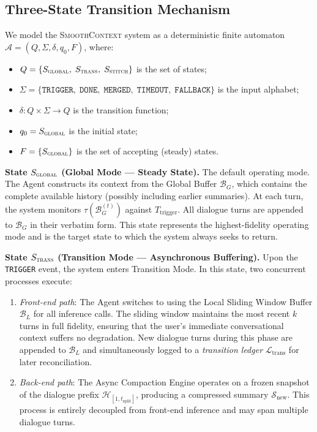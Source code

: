 \documentclass[10pt,twocolumn]{article}
\newcommand{\sys}{\textsc{SmoothContext}}
\newcommand{\bufG}{\mathcal{B}_G}
\newcommand{\bufL}{\mathcal{B}_L}
\newcommand{\Dtok}{\tau}
\newcommand{\Ttrig}{T_{\mathrm{trigger}}}
\begin{document}
\subsection{Three-State Transition Mechanism}\label{sec:state}

We model the \sys{} system as a deterministic finite automaton $\mathcal{A} = (Q, \Sigma, \delta, q_0, F)$, where:
\begin{itemize}
  \item $Q = \{S_{\textsc{global}},\; S_{\textsc{trans}},\; S_{\textsc{stitch}}\}$ is the set of states;
  \item $\Sigma = \{\texttt{TRIGGER},\; \texttt{DONE},\; \texttt{MERGED},\; \texttt{TIMEOUT},\; \texttt{FALLBACK}\}$ is the input alphabet;
  \item $\delta: Q \times \Sigma \rightarrow Q$ is the transition function;
  \item $q_0 = S_{\textsc{global}}$ is the initial state;
  \item $F = \{S_{\textsc{global}}\}$ is the set of accepting (steady) states.
\end{itemize}

\textbf{State $S_{\textsc{global}}$ (Global Mode --- Steady State).} The default operating mode. The Agent constructs its context from the Global Buffer $\bufG$, which contains the complete available history (possibly including earlier summaries). At each turn, the system monitors $\Dtok(\bufG^{(t)})$ against $\Ttrig$. All dialogue turns are appended to $\bufG$ in their verbatim form. This state represents the highest-fidelity operating mode and is the target state to which the system always seeks to return.

\textbf{State $S_{\textsc{trans}}$ (Transition Mode --- Asynchronous Buffering).} Upon the \texttt{TRIGGER} event, the system enters Transition Mode. In this state, two concurrent processes execute:

\begin{enumerate}
  \item \emph{Front-end path}: The Agent switches to using the Local Sliding Window Buffer $\bufL$ for all inference calls. The sliding window maintains the most recent $k$ turns in full fidelity, ensuring that the user's immediate conversational context suffers no degradation. New dialogue turns during this phase are appended to $\bufL$ and simultaneously logged to a \emph{transition ledger} $\mathcal{L}_{\mathrm{trans}}$ for later reconciliation.

  \item \emph{Back-end path}: The Async Compaction Engine operates on a frozen snapshot of the dialogue prefix $\mathcal{H}_{[1, t_{\mathrm{split}}]}$, producing a compressed summary $\mathcal{S}_{\mathrm{new}}$. This process is entirely decoupled from front-end inference and may span multiple dialogue turns.
\end{enumerate}
\end{document}
